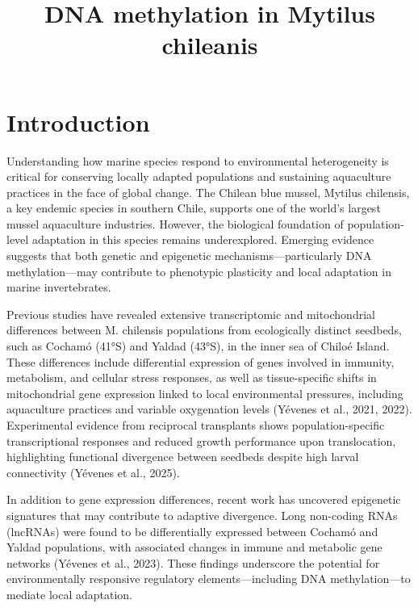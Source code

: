\documentclass[
]{agujournal2019}
\begin{document}
\title{DNA methylation in Mytilus chileanis}








\section{Introduction}\label{introduction}

Understanding how marine species respond to environmental heterogeneity
is critical for conserving locally adapted populations and sustaining
aquaculture practices in the face of global change. The Chilean blue
mussel, Mytilus chilensis, a key endemic species in southern Chile,
supports one of the world's largest mussel aquaculture industries.
However, the biological foundation of population-level adaptation in
this species remains underexplored. Emerging evidence suggests that both
genetic and epigenetic mechanisms---particularly DNA methylation---may
contribute to phenotypic plasticity and local adaptation in marine
invertebrates.

Previous studies have revealed extensive transcriptomic and
mitochondrial differences between M. chilensis populations from
ecologically distinct seedbeds, such as Cochamó (41°S) and Yaldad
(43°S), in the inner sea of Chiloé Island. These differences include
differential expression of genes involved in immunity, metabolism, and
cellular stress responses, as well as tissue-specific shifts in
mitochondrial gene expression linked to local environmental pressures,
including aquaculture practices and variable oxygenation levels (Yévenes
et al., 2021, 2022). Experimental evidence from reciprocal transplants
shows population-specific transcriptional responses and reduced growth
performance upon translocation, highlighting functional divergence
between seedbeds despite high larval connectivity (Yévenes et al.,
2025).

In addition to gene expression differences, recent work has uncovered
epigenetic signatures that may contribute to adaptive divergence. Long
non-coding RNAs (lncRNAs) were found to be differentially expressed
between Cochamó and Yaldad populations, with associated changes in
immune and metabolic gene networks (Yévenes et al., 2023). These
findings underscore the potential for environmentally responsive
regulatory elements---including DNA methylation---to mediate local
adaptation.
\end{document}
